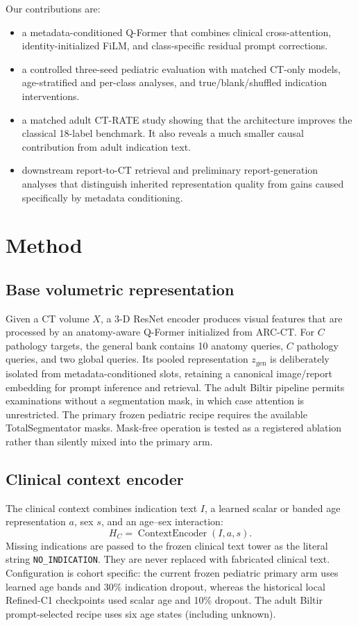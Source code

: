 \documentclass[10pt,twocolumn]{article}
\begin{document}
Our contributions are:
\begin{itemize}
    \item a metadata-conditioned Q-Former that combines clinical
    cross-attention, identity-initialized FiLM, and class-specific residual
    prompt corrections.
    \item a controlled three-seed pediatric evaluation with matched CT-only
    models, age-stratified and per-class analyses, and true/blank/shuffled
    indication interventions.
    \item a matched adult CT-RATE study showing that the architecture improves
    the classical 18-label benchmark. It also reveals a much smaller causal
    contribution from adult indication text.
    \item downstream report-to-CT retrieval and preliminary report-generation
    analyses that distinguish inherited representation quality from gains
    caused specifically by metadata conditioning.
\end{itemize}

\section{Method}
\subsection{Base volumetric representation}
Given a CT volume $X$, a 3-D ResNet encoder produces visual features that are
processed by an anatomy-aware Q-Former initialized from ARC-CT. For $C$
pathology targets, the general bank contains 10 anatomy queries, $C$ pathology
queries, and two global queries. Its pooled representation $z_{\mathrm{gen}}$
is deliberately isolated from metadata-conditioned slots, retaining a
canonical image/report embedding for prompt inference and retrieval.
The adult Biltir pipeline permits examinations without a segmentation mask,
in which case attention is unrestricted. The primary frozen pediatric recipe
requires the available TotalSegmentator masks. Mask-free operation is tested
as a registered ablation rather than silently mixed into the primary arm.

\subsection{Clinical context encoder}
The clinical context combines indication text $I$, a learned scalar or banded
age representation $a$, sex $s$, and an age--sex interaction:
\begin{equation}
H_C = \operatorname{ContextEncoder}(I,a,s).
\end{equation}
Missing indications are passed to the frozen clinical text tower as the
literal string \texttt{NO\_INDICATION}. They are never replaced with fabricated
clinical text. Configuration is cohort specific: the current frozen pediatric
primary arm uses learned age bands and 30\% indication dropout, whereas the
historical local Refined-C1 checkpoints used scalar age and 10\% dropout. The
adult Biltir prompt-selected recipe uses six age states (including unknown).
\end{document}
